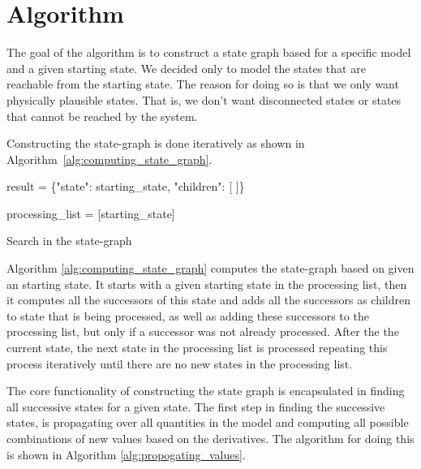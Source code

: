 \documentclass[a4paper]{article}
\begin{document}
\newpage
\section{Algorithm}
The goal of the algorithm is to construct a state graph based for a specific model and a given starting state. We decided only to model the states that are reachable from the starting state. The reason for doing so is that we only want physically plausible states. That is, we don't want disconnected states or states that cannot be reached by the system.

Constructing the state-graph is done iteratively as shown in Algorithm~\ref{alg:computing_state_graph}.

\vspace{12pt}
\begin{algorithm}[H]
    result = \{"state": starting\_state, "children": [ ]\}

    processing\_list = [starting\_state]

\caption{Search in the state-graph}
\label{alg:computing_state_graph}
\end{algorithm}
\vspace{12pt}

Algorithm \ref{alg:computing_state_graph} computes the state-graph based on given an starting state. It starts with a given starting state in the processing list, then it computes all the successors of this state and adds all the successors as children to state that is being processed, as well as adding these successors to the processing list, but only if a successor was not already processed. After the the current state, the next state in the processing list is processed repeating this process iteratively until there are no new states in the processing list.

The core functionality of constructing the state graph is encapsulated in finding all successive states for a given state. The first step in finding the successive states, is propagating over all quantities in the model and computing all possible combinations of new values based on the derivatives. The algorithm for doing this is shown in Algorithm \ref{alg:propogating_values}.
\end{document}
